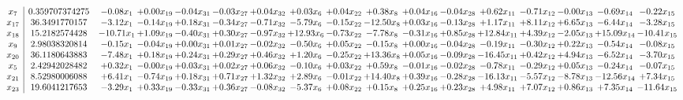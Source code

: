 \documentclass[9pt]{article}
\begin{document}
 \[\begin{array}{c| c c@{\hskip 2pt} c@{\hskip 2pt} c@{\hskip 2pt} c@{\hskip 2pt} c@{\hskip 2pt} c@{\hskip 2pt} c@{\hskip 2pt} c@{\hskip 2pt} c@{\hskip 2pt} c@{\hskip 2pt} c@{\hskip 2pt} c@{\hskip 2pt} c@{\hskip 2pt} c@{\hskip 2pt} c@{\hskip 2pt} }
 x_{7}   &  0.359707374275 & -0.08 x_{1} & +  0.00 x_{19} & -0.04 x_{31} & -0.03 x_{27} & +  0.04 x_{32} & +  0.03 x_{6} & +  0.04 x_{22} & +  0.38 x_{8} & +  0.04 x_{16} & -0.04 x_{28} & +  0.62 x_{11} & -0.71 x_{12} & -0.00 x_{13} & -0.69 x_{14} & -0.22 x_{15}\\
 x_{17}   &  36.3491770157 & -3.12 x_{1} & -0.14 x_{19} & +  0.18 x_{31} & -0.34 x_{27} & -0.71 x_{32} & -5.79 x_{6} & -0.15 x_{22} & -12.50 x_{8} & +  0.03 x_{16} & -0.13 x_{28} & +  1.17 x_{11} & +  8.11 x_{12} & +  6.65 x_{13} & -6.44 x_{14} & -3.28 x_{15}\\
 x_{18}   &  15.2182574428 & -10.71 x_{1} & +  1.09 x_{19} & -0.40 x_{31} & +  0.30 x_{27} & -0.97 x_{32} & + 12.93 x_{6} & -0.73 x_{22} & -7.78 x_{8} & -0.31 x_{16} & +  0.85 x_{28} & + 12.84 x_{11} & +  4.39 x_{12} & -2.05 x_{13} & + 15.09 x_{14} & -10.41 x_{15}\\
 x_{9}   &  2.98038320814 & -0.15 x_{1} & -0.04 x_{19} & +  0.00 x_{31} & +  0.01 x_{27} & -0.02 x_{32} & -0.50 x_{6} & +  0.05 x_{22} & -0.15 x_{8} & +  0.00 x_{16} & -0.04 x_{28} & -0.19 x_{11} & -0.30 x_{12} & +  0.22 x_{13} & -0.54 x_{14} & -0.08 x_{15}\\
 x_{20}   &  36.1180643883 & -7.48 x_{1} & +  0.18 x_{19} & +  0.24 x_{31} & +  0.29 x_{27} & +  0.46 x_{32} & +  1.20 x_{6} & -0.25 x_{22} & + 13.36 x_{8} & +  0.05 x_{16} & -0.09 x_{28} & -16.45 x_{11} & +  0.42 x_{12} & +  4.94 x_{13} & -6.52 x_{14} & -3.70 x_{15}\\
 x_{5}   &  2.42942028482 & +  0.32 x_{1} & -0.00 x_{19} & +  0.03 x_{31} & +  0.02 x_{27} & +  0.06 x_{32} & -0.10 x_{6} & +  0.03 x_{22} & +  0.59 x_{8} & -0.01 x_{16} & -0.02 x_{28} & -0.78 x_{11} & -0.29 x_{12} & +  0.05 x_{13} & -0.24 x_{14} & -0.07 x_{15}\\
 x_{21}   &  8.52980006088 & +  6.41 x_{1} & -0.74 x_{19} & +  0.18 x_{31} & +  0.71 x_{27} & +  1.32 x_{32} & +  2.89 x_{6} & -0.01 x_{22} & + 14.40 x_{8} & +  0.39 x_{16} & -0.28 x_{28} & -16.13 x_{11} & -5.57 x_{12} & -8.78 x_{13} & -12.56 x_{14} & +  7.34 x_{15}\\
 x_{23}   &  19.6041217653 & -3.29 x_{1} & +  0.33 x_{19} & -0.33 x_{31} & +  0.36 x_{27} & -0.08 x_{32} & -5.37 x_{6} & +  0.08 x_{22} & +  0.15 x_{8} & +  0.25 x_{16} & +  0.23 x_{28} & +  4.98 x_{11} & +  7.07 x_{12} & +  0.86 x_{13} & +  7.35 x_{14} & -11.64 x_{15}\\

\end{array}\]
\end{document}
